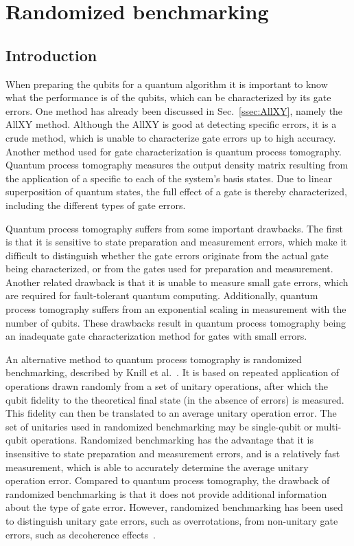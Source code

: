   \chapter{Randomized benchmarking}
    \label{ch:randomized benchmarking}

    \section{Introduction}
      \label{sec:RB introduction}
      When preparing the qubits for a quantum algorithm it is important to know what the performance is of the qubits, which can be characterized by its gate errors. One method has already been discussed in Sec.~\ref{ssec:AllXY}, namely the AllXY method. Although the AllXY is good at detecting specific errors, it is a crude method, which is unable to characterize gate errors up to high accuracy. Another method used for gate characterization is quantum process tomography. Quantum process tomography measures the output density matrix resulting from the application of a specific to each of the system's basis states. Due to linear superposition of quantum states, the full effect of a gate is thereby characterized, including the different types of gate errors.

      Quantum process tomography suffers from some important drawbacks. The first is that it is sensitive to state preparation and measurement errors, which make it difficult to distinguish whether the gate errors originate from the actual gate being characterized, or from the gates used for preparation and measurement. Another related drawback is that it is unable to measure small gate errors, which are required for fault-tolerant quantum computing. Additionally, quantum process tomography suffers from an exponential scaling in measurement with the number of qubits. These drawbacks result in quantum process tomography being an inadequate gate characterization method for gates with small errors.

      An alternative method to quantum process tomography is randomized benchmarking, described by Knill et al.~\cite{knill2008randomized}. It is based on repeated application of operations drawn randomly from a set of unitary operations, after which the qubit fidelity to the theoretical final state (in the absence of errors) is measured. This fidelity can then be translated to an average unitary operation error. The set of unitaries used in randomized benchmarking may be single-qubit or multi-qubit operations. Randomized benchmarking has the advantage that it is insensitive to state preparation and measurement errors, and is a relatively fast measurement, which is able to accurately determine the average unitary operation error. Compared to quantum process tomography, the drawback of randomized benchmarking is that it does not provide additional information about the type of gate error. However, randomized benchmarking has been used to distinguish unitary gate errors, such as overrotations, from non-unitary gate errors, such as decoherence effects~\cite{sheldon2015characterizing}.

